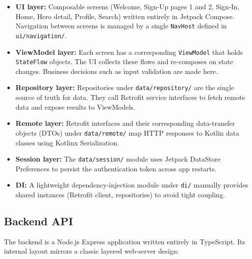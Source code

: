 \begin{itemize}
  \item \textbf{UI layer:} Composable screens (Welcome, Sign-Up pages 1 and 2, Sign-In, Home, Hero detail, Profile, Search) written entirely in Jetpack Compose. Navigation between screens is managed by a single \texttt{NavHost} defined in \texttt{ui/navigation/}.
  \item \textbf{ViewModel layer:} Each screen has a corresponding \texttt{ViewModel} that holds \texttt{StateFlow} objects. The UI collects these flows and re-composes on state changes. Business decisions such as input validation are made here.
  \item \textbf{Repository layer:} Repositories under \texttt{data/repository/} are the single source of truth for data. They call Retrofit service interfaces to fetch remote data and expose results to ViewModels.
  \item \textbf{Remote layer:} Retrofit interfaces and their corresponding data-transfer objects (DTOs) under \texttt{data/remote/} map HTTP responses to Kotlin data classes using Kotlinx Serialization.
  \item \textbf{Session layer:} The \texttt{data/session/} module uses Jetpack DataStore Preferences to persist the authentication token across app restarts.
  \item \textbf{DI:} A lightweight dependency-injection module under \texttt{di/} manually provides shared instances (Retrofit client, repositories) to avoid tight coupling.
\end{itemize}

\subsection{Backend API}

The backend is a Node.js Express application written entirely in TypeScript. Its internal layout mirrors a classic layered web-server design:

